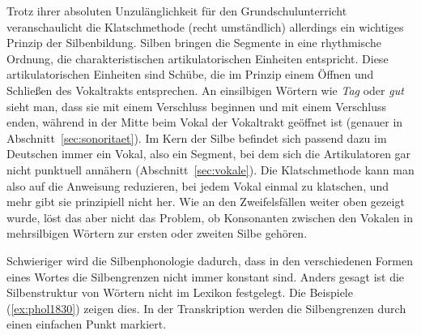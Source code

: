 Trotz ihrer absoluten Unzulänglichkeit für den Grundschulunterricht veranschaulicht die Klatschmethode (recht umständlich) allerdings ein wichtiges Prinzip der Silbenbildung.
Silben bringen die Segmente in eine rhythmische Ordnung, die charakteristischen artikulatorischen Einheiten entspricht.
Diese artikulatorischen Einheiten sind Schübe, die im Prinzip einem Öffnen und Schließen des Vokaltrakts entsprechen.
An einsilbigen Wörtern wie \textit{Tag} \textipa{[ta:k]} oder \textit{gut} \textipa{[gu:t]} sieht man, dass sie mit einem Verschluss beginnen und mit einem Verschluss enden, während in der Mitte beim Vokal der Vokaltrakt geöffnet ist (genauer in Abschnitt~\ref{sec:sonoritaet}).
Im Kern der Silbe befindet sich passend dazu im Deutschen immer ein Vokal, also ein Segment, bei dem sich die Artikulatoren gar nicht punktuell annähern (Abschnitt~\ref{sec:vokale}).
Die Klatschmethode kann man also auf die Anweisung reduzieren, bei jedem Vokal einmal zu klatschen, und mehr gibt sie prinzipiell nicht her.
Wie an den Zweifelsfällen weiter oben gezeigt wurde, löst das aber nicht das Problem, ob Konsonanten zwischen den Vokalen in mehrsilbigen Wörtern zur ersten oder zweiten Silbe gehören.

Schwieriger wird die Silbenphonologie dadurch, dass in den verschiedenen Formen eines Wortes die Silbengrenzen nicht immer konstant sind.
Anders gesagt ist die Silbenstruktur von Wörtern nicht im Lexikon festgelegt.
Die Beispiele (\ref{ex:phol1830}) zeigen dies.
In der Transkription werden die Silbengrenzen durch einen einfachen Punkt markiert.

\begin{exe}
  \ex\label{ex:phol1830}
  \begin{xlist}
  \end{xlist}
\end{exe}

